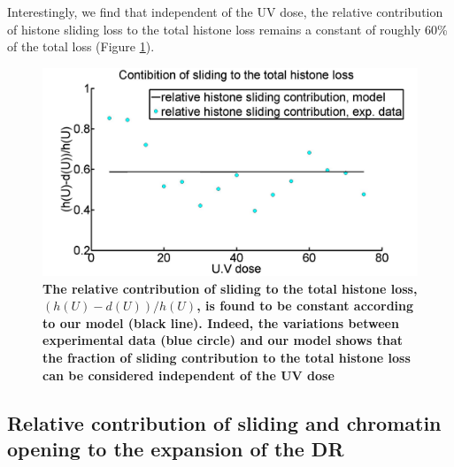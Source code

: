 \documentclass[12pt]{article}
\begin{document}
Interestingly, we find that independent of the UV dose, the relative contribution of histone sliding loss to the total histone loss remains a constant of roughly 60\% of the total loss  (Figure \ref{fig:relativeSlidingContribution}). 

\begin{figure}[H]
\centering
\includegraphics[width=0.5\linewidth, height=0.3\textheight]{relativeSlidingContribution}
\caption{\textbf{The relative contribution of sliding to the total histone loss, $(h(U)-d(U))/h(U)$, is found to be constant according to our model (black line). Indeed, the variations between experimental data (blue circle) and our model shows that the fraction of sliding contribution to the total histone loss can be considered independent of the UV dose}}
\label{fig:relativeSlidingContribution}
\end{figure}

\subsection{Relative contribution of sliding and chromatin opening to the expansion of the DR}\label{subsection:RelativecontibutionOfSlidingAndOpeningToExpansion}
\end{document}
